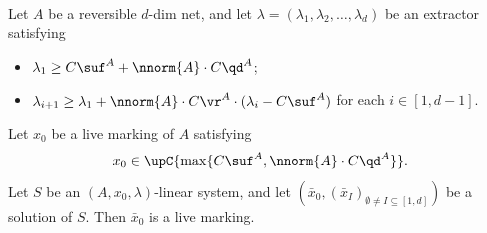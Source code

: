 \begin{lem}\label{lem:finalbasicnets}
\hfill\\
	Let $A$ be a reversible $d$-dim net, and let
	$\lambda=(\lambda_1,\lambda_2,\dots,\lambda_d)$ be an extractor
	satisfying
	\begin{itemize}
		\item
			$\lambda_1\geq
C\suf^A+\nnorm{A}\cdot C\qd^A$;
\item
	$\lambda_{i+1}\geq \lambda_1 + \nnorm{A}\cdot C\vr^A\cdot
			(\lambda_i-C\suf^A)$ for each
			$i\in[1,d{-}1]$.
	\end{itemize}
Let $x_0$ be a live marking of $A$ satisfying	
	\[x_0\in\upC{\max\{C\suf^A,\nnorm{A}\cdot
	C\qd^A\}}.\]
Let $S$ be an $(A,x_0,\lambda)$-linear system, and let
	$(\bar{x}_0,(\bar{x}_I)_{\emptyset\neq I\subseteq[1,d]})$ be a
	solution of $S$.  Then $\bar{x}_0$ is a live marking.
\end{lem}	
